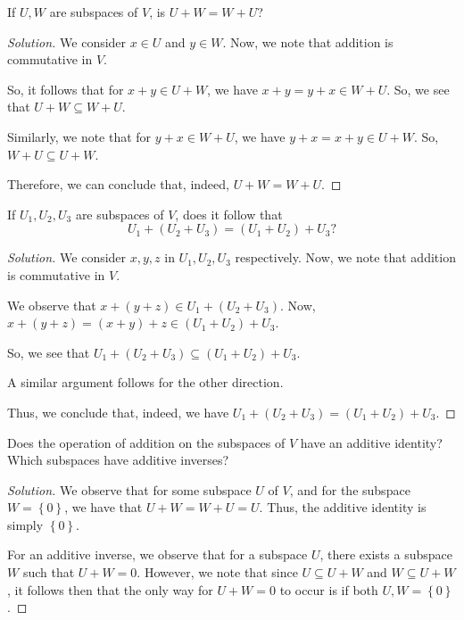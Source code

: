 \documentclass[openany]{book}
\newenvironment{solution}{\begin{proof}[Solution]}{\end{proof}}
\begin{document}
	\begin{hw}
		If $U,W$ are subspaces of $V$, is $U+W = W+U$?
	\end{hw}
	\begin{solution}
		We consider $x \in U$ and $y \in W$. Now, we note that addition is commutative in $V$.
		
		So, it follows that for $x + y \in U + W$, we have $x + y = y + x \in W + U$. So, we see that $U + W \subseteq W + U$.
		
		Similarly, we note that for $y+x \in W +U$, we have $y+x=x+y \in U + W$. So, $W+U \subseteq U+W$.
		
		Therefore, we can conclude that, indeed, $U+W=W+U$.
	\end{solution}

	\begin{hw}
		If $U_{1}, U_{2}, U_{3}$ are subspaces of $V$, does it follow that
		\begin{equation*}
			U_{1} + (U_{2} + U_{3}) = (U_{1} + U_{2}) + U_{3}?
		\end{equation*}
	\end{hw}
	\begin{solution}
		We consider $x,y,z$ in $U_{1}, U_{2}, U_{3}$ respectively. Now, we note that addition is commutative in $V$.
		
		We observe that $x + (y+z) \in U_{1} + (U_{2} + U_{3})$. Now, $x + (y+z) = (x+y)+z \in (U_{1} + U_{2}) + U_{3}$.
		
		So, we see that $U_{1} +(U_{2} + U_{3}) \subseteq (U_{1} + U_{2}) + U_{3}$.
		
		A similar argument follows for the other direction.
		
		Thus, we conclude that, indeed, we have $	U_{1} + (U_{2} + U_{3}) = (U_{1} + U_{2}) + U_{3}$.
	\end{solution}
	
	\begin{hw}
		Does the operation of addition on the subspaces of $V$ have an additive
		identity? Which subspaces have additive inverses?
	\end{hw}
	\begin{solution}
		We observe that for some subspace $U$ of $V$, and for the subspace $W = \left\{  0\right\}$, we have that $U + W = W + U = U$. Thus, the additive identity is simply $\left\{  0\right\}$.
		
		For an additive inverse, we observe that for a subspace $U$, there exists a subspace $W$ such that $U + W = 0$. However, we note that since $U \subseteq U+W$ and $W \subseteq U + W$, it follows then that the only way for $U + W = 0$ to occur is if both $U, W = \left\{  0\right\}$.
	\end{solution}
\end{document}
